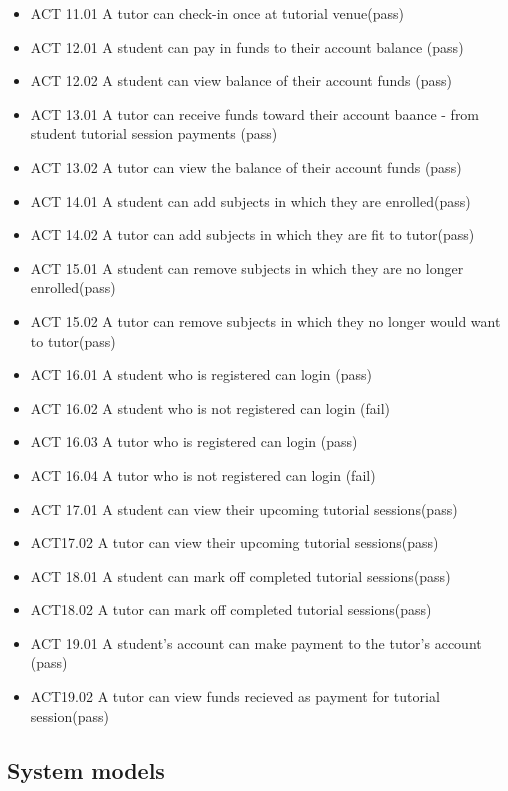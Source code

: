 \documentclass[12pt]{article}
\begin{document}
\begin{itemize}
\item ACT 11.01 A tutor can check-in once at tutorial venue(pass)
\item ACT 12.01 A student can pay in funds to their account balance (pass)
\item ACT 12.02 A student can view balance of their account funds (pass)
\item ACT 13.01 A tutor can receive funds toward their account baance - from student tutorial session payments (pass)
\item ACT 13.02 A tutor can view the balance of their account funds (pass)
\item ACT 14.01 A student can add subjects in which they are enrolled(pass)
\item ACT 14.02 A tutor can add subjects in which they are fit to tutor(pass)
\item ACT 15.01 A student can remove subjects in which they are no longer enrolled(pass)
\item ACT 15.02 A tutor can remove subjects in which they no longer would want to tutor(pass)
\item ACT 16.01 A student who is registered can login (pass)
\item ACT 16.02 A student who is not registered can login (fail)
\item ACT 16.03 A tutor who is registered can login (pass)
\item ACT 16.04 A tutor who is not registered can login (fail)
\item ACT 17.01 A student can view their upcoming tutorial sessions(pass)
\item ACT17.02	A tutor can view their upcoming tutorial sessions(pass)
\item ACT 18.01 A student can mark off completed tutorial sessions(pass)
\item ACT18.02	A tutor can mark off completed tutorial sessions(pass)
\item ACT 19.01 A student's account can make payment to the tutor's account (pass)
\item ACT19.02	A tutor can view funds recieved as payment for tutorial session(pass)
\end{itemize}

\subsection{System models}
\end{document}
